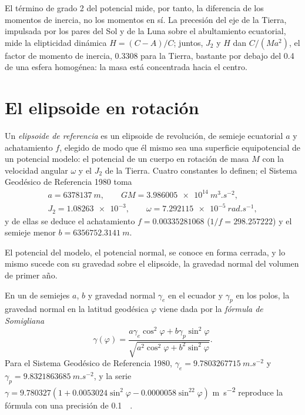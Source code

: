 El término de grado 2 del potencial mide, por tanto, la diferencia de los
momentos de inercia, no los momentos en sí. La precesión del eje de la Tierra,
impulsada por los pares del Sol y de la Luna sobre el abultamiento ecuatorial,
mide la elipticidad dinámica $H = (C - A)/C$; juntos, $J_2$ y $H$ dan
$C/(Ma^2)$, el factor de momento de inercia, \num{0.3308} para la Tierra,
bastante por debajo del \num{0.4} de una esfera homogénea: la masa está concentrada hacia
el centro.

\section{El elipsoide en rotación}

\begin{definition}\label{def:b3:gravity-geodesy:ellipsoid}
Un \emph{elipsoide de referencia} es un elipsoide de
revolución, de semieje ecuatorial $a$ y achatamiento $f$, elegido de modo que
él mismo sea una superficie equipotencial de un potencial modelo: el potencial de un cuerpo en
rotación de masa $M$ con la velocidad angular $\omega$ y el 
$J_2$ de la Tierra. Cuatro constantes lo definen; el Sistema Geodésico
de Referencia 1980 toma
\begin{gather*}
  a = \qty{6378137}{m},\qquad GM = \qty{3.986005e14}{m^3.s^{-2}},\\
  J_2 = \num{1.08263e-3},\qquad \omega = \qty{7.292115e-5}{rad.s^{-1}},
\end{gather*}
y de ellas se deduce el achatamiento $f = \num{0.00335281068}$
($1/f = \num{298.257222}$) y el semieje menor
$b = \qty{6356752.3141}{m}$.
\end{definition}

El potencial del modelo, el potencial normal, se conoce en forma cerrada, y
lo mismo sucede con su gravedad sobre el elipsoide, la gravedad normal del volumen de primer año.

\begin{proposition}\label{prop:b3:gravity-geodesy:somigliana}
En un  de semiejes $a$, $b$ y gravedad normal
$\gamma_e$ en el ecuador y $\gamma_p$ en los polos, la gravedad normal en la
latitud geodésica $\varphi$ viene dada por la \emph{fórmula de
Somigliana}
\[
  \gamma(\varphi) = \frac{a\gamma_e\cos^2\varphi + b\gamma_p\sin^2\varphi}
  {\sqrt{a^2\cos^2\varphi + b^2\sin^2\varphi}} .
\]
Para el Sistema Geodésico de Referencia 1980, $\gamma_e = \qty{9.7803267715}{m.s^{-2}}$
y $\gamma_p = \qty{9.8321863685}{m.s^{-2}}$, y la serie
$\gamma = 9.780327(1 + 0.0053024\sin^2\varphi - 0.0000058\sin^22\varphi)$
\unit{m.s^{-2}} reproduce la fórmula con una precisión de \qty{0.1}{\milli\gal}.
\end{proposition}
\admitted

